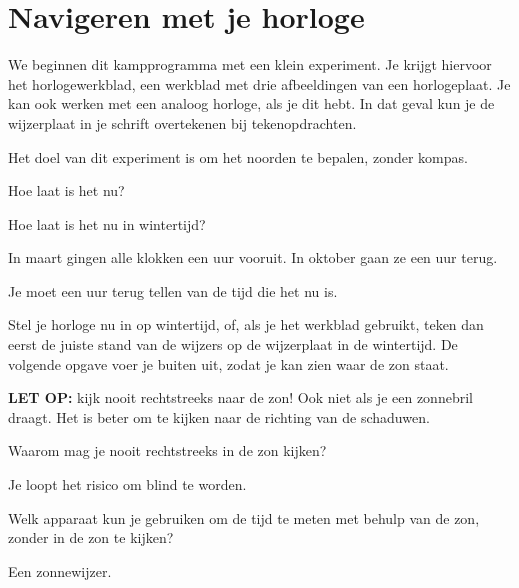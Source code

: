 \chapter{Navigeren met je horloge}

We beginnen dit kampprogramma met een klein experiment. Je krijgt hiervoor het horlogewerkblad, een werkblad met drie afbeeldingen van een horlogeplaat. Je kan ook werken met een analoog horloge, als je dit hebt. In dat geval kun je de wijzerplaat in je schrift overtekenen bij tekenopdrachten.

Het doel van dit experiment is om het noorden te bepalen, zonder kompas.

\begin{opgave}[\vinger]
    \begin{subopgave}
        Hoe laat is het nu?
    \end{subopgave}
    \begin{subopgave}
        Hoe laat is het nu in wintertijd?
        \begin{hint}
            In maart gingen alle klokken een uur vooruit. In oktober gaan ze een uur terug. 
        \end{hint}
        \begin{antwoord}
            Je moet een uur terug tellen van de tijd die het nu is.
        \end{antwoord}
    \end{subopgave}
\end{opgave}

Stel je horloge nu in op wintertijd, of, als je het werkblad gebruikt, teken dan eerst de juiste stand van de wijzers op de wijzerplaat in de wintertijd. De volgende opgave voer je buiten uit, zodat je kan zien waar de zon staat.

\textbf{LET OP:} kijk nooit rechtstreeks naar de zon! Ook niet als je een zonnebril draagt. Het is beter om te kijken naar de richting van de schaduwen.
\begin{opgave}[\discussie]
    Waarom mag je nooit rechtstreeks in de zon kijken?
    \begin{antwoord}
     Je loopt het risico om blind te worden.
    \end{antwoord}
\end{opgave}

\begin{opgave}[\discussie]
 Welk apparaat kun je gebruiken om de tijd te meten met behulp van de zon, zonder in de zon te kijken?
 \begin{antwoord}
  Een zonnewijzer.
 \end{antwoord}
\end{opgave}

